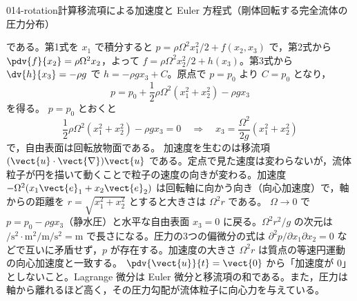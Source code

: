 \documentclass[uplatex,dvipdfmx,a4paper,11pt]{jsarticle}
\begin{document}
\begin{mondai}{014-rotation}{計算}{移流項による加速度と Euler 方程式（剛体回転する完全流体の圧力分布）}
\begin{tadashii}
である。第1式を $x_1$ で積分すると $p=\rho\Omega^{2}x_1^{2}/2+f(x_2,x_3)$ で，第2式から $\pdv{f}{x_2}=\rho\Omega^{2}x_2$，よって $f=\rho\Omega^{2}x_2^{2}/2+h(x_3)$。第3式から $\dv{h}{x_3}=-\rho g$ で $h=-\rho gx_3+C$。原点で $p=p_0$ より $C=p_0$ となり，
\[ p=p_0+\frac{1}{2}\rho\Omega^{2}(x_1^{2}+x_2^{2})-\rho gx_3 \]
を得る。
 $p=p_0$ とおくと
\[ \frac{1}{2}\rho\Omega^{2}(x_1^{2}+x_2^{2})-\rho gx_3=0\quad\Longrightarrow\quad x_3=\frac{\Omega^{2}}{2g}(x_1^{2}+x_2^{2}) \]
で，自由表面は回転放物面である。
 加速度を生むのは移流項 $(\vect{u}\cdot\vect{\nabla})\vect{u}$ である。定点で見た速度は変わらないが，流体粒子が円を描いて動くことで粒子の速度の向きが変わる。加速度 $-\Omega^{2}(x_1\vect{e}_1+x_2\vect{e}_2)$ は回転軸に向かう向き（向心加速度）で，軸からの距離を $r=\sqrt{x_1^{2}+x_2^{2}}$ とすると大きさは $\Omega^{2}r$ である。
\kenzan $\Omega\to0$ で $p=p_0-\rho gx_3$（静水圧）と水平な自由表面 $x_3=0$ に戻る。$\Omega^{2}r^{2}/g$ の次元は $\unit{\per\second\squared}\cdot\unit{\metre\squared}/\unit{\metre\per\second\squared}=\unit{\metre}$ で長さになる。圧力の3つの偏微分の式は $\partial^{2}p/\partial x_1\partial x_2=0$ などで互いに矛盾せず，$p$ が存在する。加速度の大きさ $\Omega^{2}r$ は質点の等速円運動の向心加速度と一致する。
\tsumazuki $\pdv{\vect{u}}{t}=\vect{0}$ から「加速度が $0$」としないこと。Lagrange 微分は Euler 微分と移流項の和である。また，圧力は軸から離れるほど高く，その圧力勾配が流体粒子に向心力を与えている。
\end{tadashii}
\end{mondai}
\end{document}
